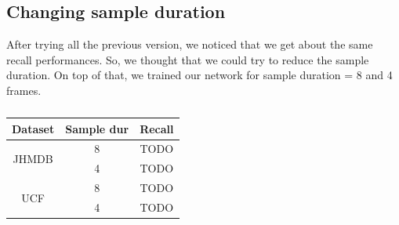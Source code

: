 \documentclass{report}
\begin{document}
\subsection{Changing sample duration}
After trying all the previous version, we noticed that we get about the same recall performances. So, we thought that we could try
to reduce the sample duration. On top of that, we trained our network for sample duration = 8 and 4 frames.

\begin{table}
  \centering
  \begin{tabular}{|c | c| c|}
    \hline
    \textbf{Dataset} & \textbf{Sample dur} & \textbf{Recall} \\
    \hline
    \multirow{2}{*}{JHMDB} & 8 & TODO \\
    \cline{2-3}
    {} & 4 & TODO \\
    \hline
    \multirow{2}{*}{UCF} & 8 & TODO \\
    \cline{2-3}
    {} & 4 & TODO \\
    \hline
    
  \end{tabular}
  \caption{}
  \label{table:reg_2_sample}
\end{table}
                                             
                                             
    

    
\end{document}
